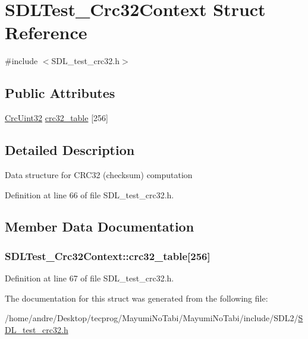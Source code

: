 \hypertarget{struct_s_d_l_test___crc32_context}{\section{S\-D\-L\-Test\-\_\-\-Crc32\-Context Struct Reference}
\label{struct_s_d_l_test___crc32_context}
}


{\ttfamily \#include $<$S\-D\-L\-\_\-test\-\_\-crc32.\-h$>$}

\subsection*{Public Attributes}
\begin{DoxyCompactItemize}
\item 
\hyperlink{_s_d_l__test__crc32_8h_ac0e8fe38fa91e9aa4b32957420795387}{Crc\-Uint32} \hyperlink{struct_s_d_l_test___crc32_context_ae95d0d0b48bafc4e2f6f032f754ffa4c}{crc32\-\_\-table} \mbox{[}256\mbox{]}
\end{DoxyCompactItemize}


\subsection{Detailed Description}
Data structure for C\-R\-C32 (checksum) computation 

Definition at line 66 of file S\-D\-L\-\_\-test\-\_\-crc32.\-h.



\subsection{Member Data Documentation}
\hypertarget{struct_s_d_l_test___crc32_context_ae95d0d0b48bafc4e2f6f032f754ffa4c}{
\subsubsection[{crc32\-\_\-table}]{ S\-D\-L\-Test\-\_\-\-Crc32\-Context\-::crc32\-\_\-table\mbox{[}256\mbox{]}}}\label{struct_s_d_l_test___crc32_context_ae95d0d0b48bafc4e2f6f032f754ffa4c}


Definition at line 67 of file S\-D\-L\-\_\-test\-\_\-crc32.\-h.



The documentation for this struct was generated from the following file\-:\begin{DoxyCompactItemize}
\item 
/home/andre/\-Desktop/tecprog/\-Mayumi\-No\-Tabi/\-Mayumi\-No\-Tabi/include/\-S\-D\-L2/\hyperlink{_s_d_l__test__crc32_8h}{S\-D\-L\-\_\-test\-\_\-crc32.\-h}\end{DoxyCompactItemize}
